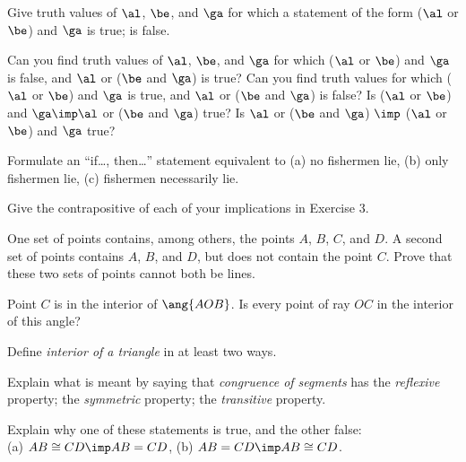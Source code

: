 \documentclass[11pt]{book}
\theoremstyle{bkplain}
\theoremstyle{XIplainnote}
\theoremstyle{bkplain}
\theoremstyle{bkplain}
\begin{document}
\begin{exlist}
\item Give truth values of $\al$, $\be$, and $\ga$ for which a statement of the
  form ($\al$ or $\be$) and $\ga$ is true; is false.
\item Can you find truth values of $\al$, $\be$, and $\ga$ for which ($\al$ or
  $\be$) and $\ga$ is false, and $\al$ or ($\be$ and $\ga$) is true? Can you
  find truth values for which ($\al$ or $\be$) and $\ga$ is true, and $\al$ or
  ($\be$ and $\ga$) is false? Is ($\al$ or $\be$) and
  $\ga \imp \al$ or ($\be$ and $\ga$) true? Is $\al$ or ($\be$ and $\ga$)
  $\imp$ ($\al$ or $\be$) and $\ga$ true?
\item Formulate an ``if\ldots, then\ldots'' statement equivalent to (a) no
  fishermen lie, (b) only fishermen lie, (c) fishermen necessarily lie.
\item Give the contrapositive of each of your implications in Exercise 3.
\item One set of points contains, among others, the points $A$, $B$, $C$, and
  $D$. A second set of points contains $A$, $B$, and $D$, but does not contain
  the point $C$. Prove that these two sets of points cannot both be lines.
\item Point $C$ is in the interior of $\ang{AOB}$. Is every point of ray $OC$
  in the interior of this angle?
\item Define \emph{interior of a triangle} in at least two ways.
\item Explain what is meant by saying that \emph{congruence of segments} has
  the \emph{reflexive} property; the \emph{symmetric} property; the
  \emph{transitive} property.
\item Explain why one of these statements is true, and the other false:\\
  (a) $AB \cong CD \imp AB = CD$, (b) $AB = CD \imp AB \cong CD$.
\end{exlist}
\end{document}
